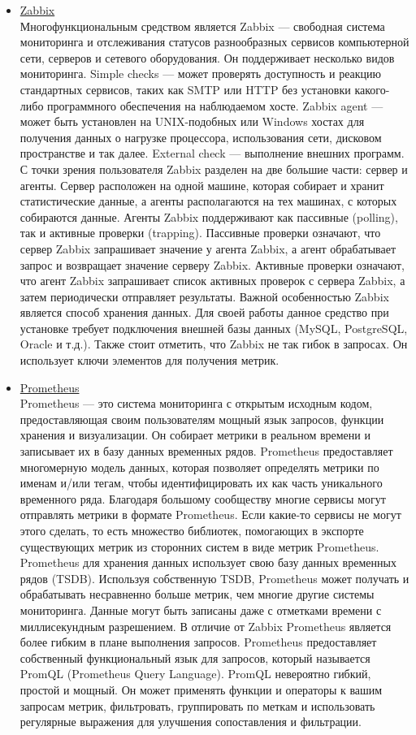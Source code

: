 \begin{itemize}

	\item \underline{Zabbix}\\ Многофункциональным средством является Zabbix — свободная система мониторинга и отслеживания статусов разнообразных сервисов компьютерной сети, серверов и сетевого оборудования. Он поддерживает несколько видов мониторинга. Simple checks — может проверять доступность и реакцию стандартных сервисов, таких как SMTP или HTTP без установки какого-либо программного обеспечения на наблюдаемом хосте. Zabbix agent — может быть установлен на UNIX-подобных или Windows хостах для получения данных о нагрузке процессора, использования сети, дисковом пространстве и так далее. External check — выполнение внешних программ. 
	С точки зрения пользователя Zabbix разделен на две большие части: сервер и агенты. Сервер расположен на одной машине, которая собирает и хранит статистические данные, а агенты располагаются на тех машинах, с которых собираются данные. Агенты Zabbix поддерживают как пассивные (polling), так и активные проверки (trapping). Пассивные проверки означают, что сервер Zabbix запрашивает значение у агента Zabbix, а агент обрабатывает запрос и возвращает значение серверу Zabbix. Активные проверки означают, что агент Zabbix запрашивает список активных проверок с сервера Zabbix, а затем периодически отправляет результаты.
	Важной особенностью Zabbix является способ хранения данных. Для своей работы данное средство при установке требует подключения внешней базы данных (MySQL, PostgreSQL, Oracle и т.д.).
	Также стоит отметить, что Zabbix не так гибок в запросах. Он использует ключи элементов для получения метрик.
	\item \underline{Prometheus}\\ Prometheus — это система мониторинга с открытым исходным кодом, предоставляющая своим пользователям мощный язык запросов, функции хранения и визуализации. Он собирает метрики в реальном времени и записывает их в базу данных временных рядов. Prometheus предоставляет многомерную модель данных, которая позволяет определять метрики по именам и/или тегам, чтобы идентифицировать их как часть уникального временного ряда. Благодаря большому сообществу многие сервисы могут отправлять метрики в формате Prometheus. Если какие-то сервисы не могут этого сделать, то есть множество библиотек, помогающих в экспорте существующих метрик из сторонних систем в виде метрик Prometheus. 
	Prometheus для хранения данных использует свою базу данных временных рядов (TSDB). Используя собственную TSDB, Prometheus может получать и обрабатывать несравненно больше метрик, чем многие другие системы мониторинга. Данные могут быть записаны даже с отметками времени с миллисекундным разрешением. 
	В отличие от Zabbix Prometheus является более гибким в плане выполнения запросов. Prometheus предоставляет собственный функциональный язык для запросов, который называется PromQL (Prometheus Query Language). PromQL невероятно гибкий, простой и мощный. Он может применять функции и операторы к вашим запросам метрик, фильтровать, группировать по меткам и использовать регулярные выражения для улучшения сопоставления и фильтрации.
\end{itemize} 

